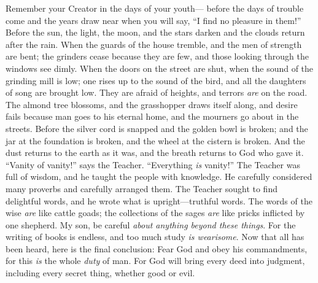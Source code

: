 \begin{biblechapter} %
 Remember your Creator in the days of your youth— 
before the days of trouble come 
and the years draw near when you will say, 
“I find no pleasure in them!”
\verse Before the sun, the light, the moon, and the stars darken 
and the clouds return after the rain.
\verse When the guards of the house tremble, 
and the men of strength are bent; 
the grinders cease because they are few, 
and those looking through the windows see dimly.
\verse When the doors on the street are shut, 
when the sound of the grinding mill is low; 
one rises up to the sound of the bird, 
and all the daughters of song are brought low.
\verse They are afraid of heights, 
and terrors \textit{are} on the road. 
The almond tree blossoms, 
and the grasshopper draws itself along, and desire fails 
because man goes to his eternal home, 
and the mourners go about in the streets.
\verse Before the silver cord is snapped 
and the golden bowl is broken; 
and the jar at the foundation is broken, 
and the wheel at the cistern is broken.
\verse And the dust returns to the earth as it was, 
and the breath returns to God who gave it.
 “Vanity of vanity!” says the Teacher. 
“Everything \textit{is} vanity!”
 The Teacher was full of wisdom, and he taught the people with knowledge. He carefully considered many proverbs and carefully arranged them.
\verse The Teacher sought to find delightful words, and he wrote what is upright—truthful words.
\verse The words of the wise \textit{are} like cattle goads; the collections of the sages \textit{are} like pricks inflicted by one shepherd.
\verse My son, be careful \textit{about anything beyond these things}. For the writing of books is endless, and too much study \textit{is wearisome}.
\verse Now that all has been heard, here is the final conclusion: 
Fear God and obey his commandments, 
for this \textit{is} the whole \textit{duty} of man.
\verse For God will bring every deed into judgment, 
including every secret thing, whether good or evil.
\end{biblechapter}

